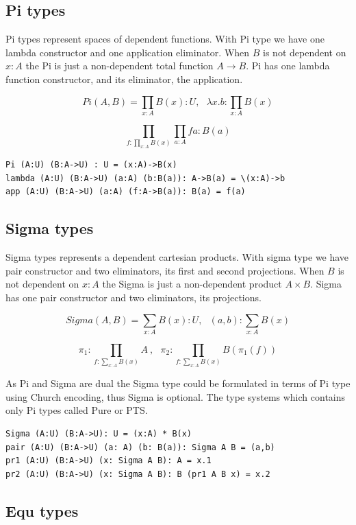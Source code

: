 \documentclass{svproc}
\begin{document}
\subsection{Pi types}

Pi types represent spaces of dependent functions.
With Pi type we have one lambda constructor
and one application eliminator. When $B$ is not dependent on $x:A$
the Pi is just a non-dependent total function $A \rightarrow B$.
Pi has one lambda function constructor, and its eliminator, the application.

$$Pi(A,B) = \prod_{x:A} B(x) : U,\ \ \ 
  \lambda x . b : \prod_{x:A} B(x)$$

$$\prod_{f:\prod_{x:A}B(x)}\prod_{a:A} f a : B (a)$$

\begin{lstlisting}[mathescape=true]
Pi (A:U) (B:A->U) : U = (x:A)->B(x)
lambda (A:U) (B:A->U) (a:A) (b:B(a)): A->B(a) = \(x:A)->b
app (A:U) (B:A->U) (a:A) (f:A->B(a)): B(a) = f(a)
\end{lstlisting}

\subsection{Sigma types}

Sigma types represents a dependent cartesian products.
With sigma type we have pair constructor and two eliminators,
its first and second projections. When $B$ is not dependent on $x:A$
the Sigma is just a non-dependent product $A \times B$.
Sigma has one pair constructor and two eliminators, its projections.

$$Sigma(A,B) = \sum_{x:A} B(x) : U,\ \ \ 
  (a,b) : \sum_{x:A} B(x)$$

$$\pi_1 : \prod_{f:\sum_{x:A}B(x)}A\ ,\ \ \ \pi_2 : \prod_{f:\sum_{x:A}B(x)}B(\pi_1(f))$$

As Pi and Sigma are dual the Sigma type could be formulated
in terms of Pi type using Church encoding, thus Sigma is optional.
The type systems which contains only Pi types called Pure or PTS.

\begin{lstlisting}[mathescape=true]
Sigma (A:U) (B:A->U): U = (x:A) * B(x)
pair (A:U) (B:A->U) (a: A) (b: B(a)): Sigma A B = (a,b)
pr1 (A:U) (B:A->U) (x: Sigma A B): A = x.1
pr2 (A:U) (B:A->U) (x: Sigma A B): B (pr1 A B x) = x.2
\end{lstlisting}

\newpage
\subsection{Equ types}
\end{document}
